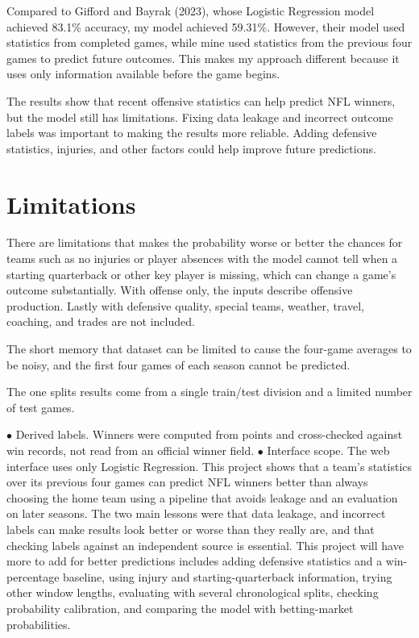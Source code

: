 \documentclass[sigconf,nonacm]{acmart}
\begin{document}
Compared to Gifford and Bayrak (2023), whose Logistic Regression model achieved 83.1\% accuracy, my model achieved 59.31\%. However, their model used statistics from completed games, while mine used statistics from the previous four games to predict future outcomes. This makes my approach different because it uses only information available before the game begins.

The results show that recent offensive statistics can help predict NFL winners, but the model still has limitations. Fixing data leakage and incorrect outcome labels was important to making the results more reliable. Adding defensive statistics, injuries, and other factors could help improve future predictions.

\section{Limitations}
There are limitations that makes the probability worse or better the chances for teams such as no injuries or player absences with the model cannot tell when a starting quarterback or other key player is missing, which can change a game's outcome substantially. With offense only, the inputs describe offensive production. Lastly with defensive quality, special teams, weather, travel, coaching, and trades are not included.

The short memory that dataset can be limited to cause the four-game averages to be noisy, and the first four games of each season cannot be predicted.

The one splits results come from a single train/test division and a limited number of test games.

\noindent $\bullet$ Derived labels. Winners were computed from points and cross-checked against win records, not read from an official winner field.
\noindent $\bullet$ Interface scope. The web interface uses only Logistic Regression.
This project shows that a team's statistics over its previous four games can predict NFL winners better than always choosing the home team using a pipeline that avoids leakage and an evaluation on later seasons. The two main lessons were that data leakage, and incorrect labels can make results look better or worse than they really are, and that checking labels against an independent source is essential. This project will have more to add for better predictions includes adding defensive statistics and a win-percentage baseline, using injury and starting-quarterback information, trying other window lengths, evaluating with several chronological splits, checking probability calibration, and comparing the model with betting-market probabilities.
\end{document}
